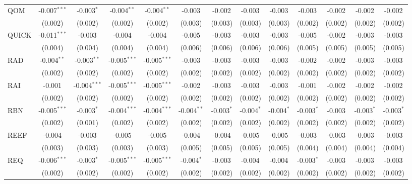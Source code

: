 \begin{table}[!htbp]
\begin{tabular}{@{\extracolsep{5pt}}lcccccccccccc}
 QOM & -0.007$^{***}$ & -0.003$^{*}$ & -0.004$^{**}$ & -0.004$^{**}$ & -0.003$^{}$ & -0.002$^{}$ & -0.003$^{}$ & -0.003$^{}$ & -0.003$^{}$ & -0.002$^{}$ & -0.002$^{}$ & -0.002$^{}$ \\
  & (0.002) & (0.002) & (0.002) & (0.002) & (0.003) & (0.003) & (0.003) & (0.003) & (0.002) & (0.002) & (0.002) & (0.002) \\
 QUICK & -0.011$^{***}$ & -0.003$^{}$ & -0.004$^{}$ & -0.004$^{}$ & -0.005$^{}$ & -0.003$^{}$ & -0.003$^{}$ & -0.003$^{}$ & -0.005$^{}$ & -0.002$^{}$ & -0.003$^{}$ & -0.003$^{}$ \\
  & (0.004) & (0.004) & (0.004) & (0.004) & (0.006) & (0.006) & (0.006) & (0.006) & (0.005) & (0.005) & (0.005) & (0.005) \\
 RAD & -0.004$^{**}$ & -0.003$^{**}$ & -0.005$^{***}$ & -0.005$^{***}$ & -0.003$^{}$ & -0.003$^{}$ & -0.003$^{}$ & -0.003$^{}$ & -0.002$^{}$ & -0.002$^{}$ & -0.003$^{}$ & -0.003$^{}$ \\
  & (0.002) & (0.002) & (0.002) & (0.002) & (0.002) & (0.002) & (0.002) & (0.002) & (0.002) & (0.002) & (0.002) & (0.002) \\
 RAI & -0.001$^{}$ & -0.004$^{***}$ & -0.005$^{***}$ & -0.005$^{***}$ & -0.002$^{}$ & -0.003$^{}$ & -0.003$^{}$ & -0.003$^{}$ & -0.001$^{}$ & -0.002$^{}$ & -0.002$^{}$ & -0.002$^{}$ \\
  & (0.002) & (0.002) & (0.002) & (0.002) & (0.002) & (0.002) & (0.002) & (0.002) & (0.002) & (0.002) & (0.002) & (0.002) \\
 RBN & -0.005$^{***}$ & -0.003$^{*}$ & -0.004$^{***}$ & -0.004$^{***}$ & -0.004$^{**}$ & -0.003$^{*}$ & -0.004$^{*}$ & -0.004$^{*}$ & -0.003$^{*}$ & -0.003$^{}$ & -0.003$^{*}$ & -0.003$^{*}$ \\
  & (0.002) & (0.001) & (0.002) & (0.002) & (0.002) & (0.002) & (0.002) & (0.002) & (0.002) & (0.002) & (0.002) & (0.002) \\
 REEF & -0.004$^{}$ & -0.003$^{}$ & -0.005$^{}$ & -0.005$^{}$ & -0.004$^{}$ & -0.004$^{}$ & -0.005$^{}$ & -0.005$^{}$ & -0.003$^{}$ & -0.003$^{}$ & -0.003$^{}$ & -0.003$^{}$ \\
  & (0.003) & (0.003) & (0.003) & (0.003) & (0.005) & (0.005) & (0.005) & (0.005) & (0.004) & (0.004) & (0.004) & (0.004) \\
 REQ & -0.006$^{***}$ & -0.003$^{*}$ & -0.005$^{***}$ & -0.005$^{***}$ & -0.004$^{*}$ & -0.003$^{}$ & -0.004$^{}$ & -0.004$^{}$ & -0.003$^{*}$ & -0.003$^{}$ & -0.003$^{}$ & -0.003$^{}$ \\
  & (0.002) & (0.002) & (0.002) & (0.002) & (0.002) & (0.002) & (0.002) & (0.002) & (0.002) & (0.002) & (0.002) & (0.002) \\

\end{tabular}
\end{table}
